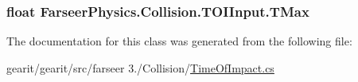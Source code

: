 \hypertarget{class_farseer_physics_1_1_collision_1_1_t_o_i_input_a11f7e5d89d1063764a2b4ffa8539c824}{
\subsubsection[{T\+Max}]{\setlength{\rightskip}{0pt plus 5cm}float Farseer\+Physics.\+Collision.\+T\+O\+I\+Input.\+T\+Max}}\label{class_farseer_physics_1_1_collision_1_1_t_o_i_input_a11f7e5d89d1063764a2b4ffa8539c824}


The documentation for this class was generated from the following file\+:\begin{DoxyCompactItemize}
\item 
gearit/gearit/src/farseer 3./\+Collision/\hyperlink{_time_of_impact_8cs}{Time\+Of\+Impact.\+cs}\end{DoxyCompactItemize}
